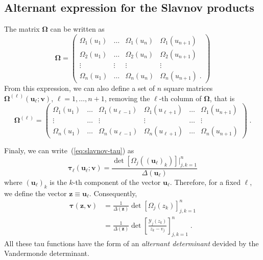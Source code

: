 \documentclass[a4paper,12pt]{amsart}
\begin{document}
\subsection{Alternant expression for the Slavnov products}

The matrix \(\bm{\Omega}\) can be written as
\begin{equation}
  \bm{\Omega} =
  \begin{pmatrix}
    \Omega_1(u_1) & \dots & \Omega_1(u_n) & \Omega_1(u_{n+1}) \\
    \Omega_2(u_1) & \dots & \Omega_2(u_n) & \Omega_2(u_{n+1}) \\
    \vdots & \vdots & \vdots & \vdots \\
    \Omega_n(u_1) & \dots & \Omega_n(u_n) & \Omega_n(u_{n+1})\; .
  \end{pmatrix}
\end{equation}
From this expression, we can also define a set of \(n\) square matrices
\(\bm\Omega^{(\ell)}(\bm{u}_\ell; \bm{v})\),
\(\ell = 1, \dots, n+1\), removing the \(\ell\)-th column of
\(\bm{\Omega}\), that is
\begin{equation}
  \bm{\Omega}^{(\ell)} =
  \begin{pmatrix}
    \Omega_1(u_1) & \dots & \Omega_1(u_{\ell-1}) & \Omega_1(u_{\ell+1})&\dots & \Omega_1(u_{n+1}) \\
    \vdots & \dots & \vdots & \vdots & \dots & \vdots \\
    \Omega_n(u_1) & \dots & \Omega_n(u_{\ell-1}) & \Omega_n(u_{\ell+1})&\dots & \Omega_n(u_{n+1})
  \end{pmatrix}\; .
\end{equation}

Finaly, we can write~(\ref{eq:slavnov-tau}) as 
\begin{equation}
\label{eq:slavnov-tau-functions}
  \bm{\tau}_\ell(\bm{u}_\ell; \bm{v}) = \frac{\det [\Omega_j((\bm{u}_\ell)_k)]|_{j,k=1}^n }{\Delta(\bm{u}_\ell)} 
\end{equation}
where \((\bm{u}_\ell)_k \) is the \(k\)-th component of the vector
\(\bm{u}_\ell\).  Therefore, for a fixed \(\ell\), we define the
vector \( \bm{z} \equiv \bm{u}_\ell\).  Consequently,
\begin{equation}
\begin{split}
\label{eq:slav-tau-function}
  \bm{\tau}(\bm{z}, \bm{v})
  & = \frac{1}{\Delta(\bm{z})} \det[\Omega_j(z_k) ]_{j,k=1}^n \\
  & = \frac{1}{\Delta(\bm{z})} \det\left[\frac{\mathcal{Y}_j(z_k)}{z_k - v_j} \right]_{j,k=1}^n  \; .
\end{split}
\end{equation}
All these tau functions have the form of an \emph{alternant
determinant} devided by the Vandermonde determinant.
\end{document}
